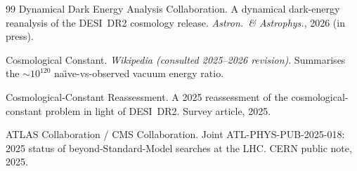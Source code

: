 \documentclass[11pt,a4paper]{article}
\theoremstyle{definition}
\theoremstyle{remark}
\begin{document}
\begin{thebibliography}{99}
Dynamical Dark Energy Analysis Collaboration.
\newblock A dynamical dark-energy reanalysis of the DESI~DR2
cosmology release.
\newblock \emph{Astron.\ \& Astrophys.}, 2026 (in press).

Cosmological Constant.
\newblock \emph{Wikipedia (consulted 2025--2026 revision)}.
\newblock Summarises the ${\sim}10^{120}$ na\"\i ve-vs-observed
vacuum energy ratio.

Cosmological-Constant Reassessment.
\newblock A 2025 reassessment of the cosmological-constant problem
in light of DESI~DR2.
\newblock Survey article, 2025.

ATLAS Collaboration / CMS Collaboration.
\newblock Joint ATL-PHYS-PUB-2025-018: 2025 status of
beyond-Standard-Model searches at the LHC.
\newblock CERN public note, 2025.

\end{thebibliography}
\end{document}
